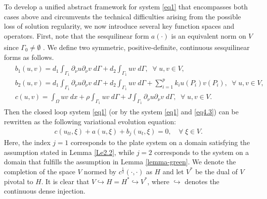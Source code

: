 \documentclass[twoside]{article}
\theoremstyle{noparens}
\theoremstyle{definition}
\numberwithin{equation}{section}
\numberwithin{figure}{section}
\newcommand{\citeup}[1]{\textsuperscript{\cite{#1}}}
\begin{document}
To develop a unified abstract framework for system \eqref{eq1} that encompasses both cases above and circumvents the technical difficulties arising from the possible loss of solution regularity, we now introduce several key function spaces and operators. First, note that the sesquilinear form $a(\cdot)$ is an equivalent norm on  $V $ since
$\Gamma_0 \not= \emptyset$  \citeup{JE,Rao2}. We define two symmetric, positive-definite, continuous sesquilinear forms as follows.
\begin{align*}
	\begin{split}
		&b_1(u,v) = d_1 \int_{\Gamma_1}\partial_{\nu}u  {\partial_{\nu}v}\; d\Gamma
		+d_2\int_{\Gamma_1} u  {v}\; d\Gamma ,\;\;\forall\; u ,v \in V,\\
		&b_2(u,v) = d_1 \int_{\Gamma_1}\partial_{\nu}u  {\partial_{\nu}v}\; d\Gamma
		+d_2\int_{\Gamma_1} u  {v}\; d\Gamma
		+ \sum_{i=1}^{p} k_i u(P_i) {v(P_i)},\;\;\forall\; u ,v \in V,\\
		&c(u,v) = \int_{\Omega}u  {v} \;dx + \rho \int_{\Gamma_1}u {v} \;d\Gamma
		+ J\int_{\Gamma_1}\partial_{\nu}u {\partial_{\nu}v}\;d\Gamma,\;\;\forall\; u ,v\in V.
	\end{split}
\end{align*}
Then the closed loop system \eqref{eq1} (or by the system \eqref{eq1} and \eqref{eq4.3})  can be rewritten as the following variational evolution equation:
\begin{align}
	c(u_{tt}, \xi) + a(u,\xi) + b_j(u_t,\xi)  = 0,\quad \forall\; \xi \in V.
\end{align}
Here, the index $j=1$ corresponds to the plate system on a domain satisfying the assumption stated in Lemma \ref{Le2.2}, while  $j=2$ corresponds to the system on a domain that fulfills the assumption in Lemma \ref{lemma-green}.
We denote the completion of the space $V$ normed by $c^{\frac{1}{2}}(\cdot,\cdot)$ as $H$ and let $V^*$ be the dual of $V$ pivotal to $H$. It is clear that $V\hookrightarrow H= H^*\hookrightarrow V^*$, where $\hookrightarrow$ denotes the continuous dense injection.
\end{document}
